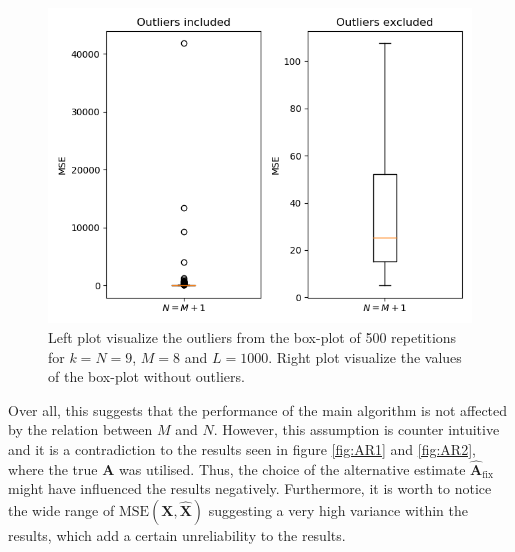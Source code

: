 \begin{figure}[H]
    \centering
	\includegraphics[scale=0.5]{figures/ch_6/boxplot.png}
	\caption{Left plot visualize the outliers from the box-plot of 500 repetitions for $k=N=9$, $M=8$ and $L=1000$. Right plot visualize the values of the box-plot without outliers.}
	\label{fig:box}
\end{figure}
\noindent 
Over all, this suggests that the performance of the main algorithm is not affected by the relation between $M$ and $N$.
However, this assumption is counter intuitive and it is a contradiction to the results seen in figure \ref{fig:AR1} and \ref{fig:AR2}, where the true $\mathbf{A}$ was utilised. 
Thus, the choice of the alternative estimate $\hat{\mathbf{A}}_{\text{fix}}$ might have influenced the results negatively. 
Furthermore, it is worth to notice the wide range of $\text{MSE}(\mathbf{X}, \hat{\mathbf{X}})$ suggesting a very high variance within the results, which add a certain unreliability to the results.    